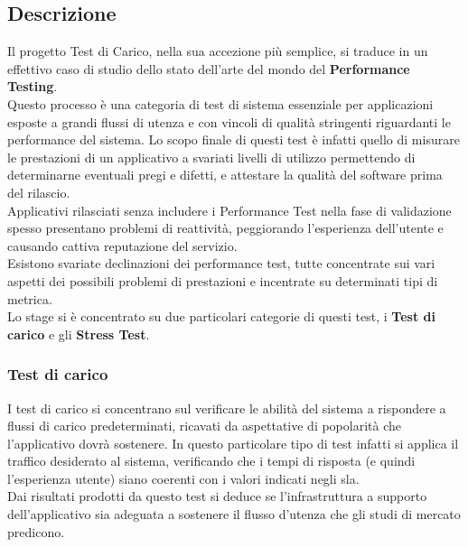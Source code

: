 \subsection{Descrizione}
Il progetto Test di Carico, nella sua accezione più semplice, si traduce in un effettivo caso di studio dello stato dell'arte del mondo del \textbf{Performance Testing}. \\
Questo processo è una categoria di test di sistema essenziale per applicazioni esposte a grandi flussi di utenza e con vincoli di qualità stringenti riguardanti le performance del sistema. Lo scopo finale di questi test è infatti quello di misurare le prestazioni di un applicativo a svariati livelli di utilizzo permettendo di determinarne eventuali pregi e difetti, e attestare la qualità del software prima del rilascio. \\
Applicativi rilasciati senza includere i Performance Test nella fase di validazione spesso presentano problemi di reattività, peggiorando l'esperienza dell'utente e causando cattiva reputazione del servizio. \\
Esistono svariate declinazioni dei performance test, tutte concentrate sui vari aspetti dei possibili problemi di prestazioni e incentrate su determinati tipi di metrica. \\
Lo stage si è concentrato su due particolari categorie di questi test, i \textbf{Test di carico} e gli \textbf{Stress Test}.
\subsubsection{Test di carico}
I test di carico si concentrano sul verificare le abilità del sistema a rispondere a flussi di carico predeterminati, ricavati da aspettative di popolarità che l'applicativo dovrà sostenere. In questo particolare tipo di test infatti si applica il traffico desiderato al sistema, verificando che i tempi di risposta (e quindi l'esperienza utente) siano coerenti con i valori indicati negli \gls{sla}. \\
Dai risultati prodotti da questo test si deduce se l'infrastruttura a supporto dell'applicativo sia adeguata a sostenere il flusso d'utenza che gli studi di mercato predicono.

